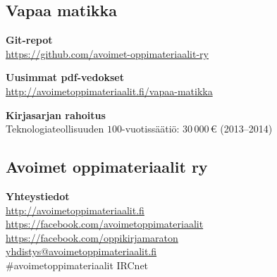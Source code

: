 \subsection*{Vapaa matikka}

\textbf{Git-repot} \\
\url{https://github.com/avoimet-oppimateriaalit-ry}

\textbf{Uusimmat pdf-vedokset} \\
\url{http://avoimetoppimateriaalit.fi/vapaa-matikka}

\textbf{Kirjasarjan rahoitus} \\
Teknologiateollisuuden $100$-vuotissäätiö: $30\,000$\,\euro \; (2013--2014)

\subsection*{Avoimet oppimateriaalit ry}

\textbf{Yhteystiedot} \\
\url{http://avoimetoppimateriaalit.fi} \\
\url{https://facebook.com/avoimetoppimateriaalit} \\
\url{https://facebook.com/oppikirjamaraton} \\
\href{mailto:yhdistys@avoimetoppimateriaalit.fi}{yhdistys@avoimetoppimateriaalit.fi} \\
\#avoimetoppimateriaalit \@ IRCnet
